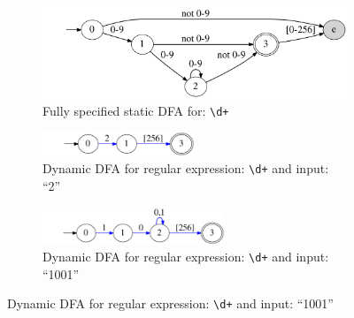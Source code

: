 \begin{figure}[t]
  \begin{subfigure}[t]{0.45\textwidth}
  	\centering
    \includegraphics[width=\textwidth]{figures/digitsDFA}
    \vspace{-12pt}
    \caption{Fully specified static DFA for: {\tt \textbackslash d+}}
    \label{fig:staticfull}
  \end{subfigure}


\vspace{12pt}
  \begin{subfigure}[t]{0.45\textwidth}
  	\centering
    \includegraphics[width=0.5\textwidth]{figures/digits2}
    \vspace{-6pt}
    \caption{Dynamic DFA for regular expression: {\tt \textbackslash d+} and input: ``2''}
    \label{fig:match1}
  \end{subfigure}

\vspace{6pt}

  \begin{subfigure}[t]{0.45\textwidth}
  	\centering
    \includegraphics[width=0.6\textwidth]{figures/digits1001}
    \vspace{-6pt}
    \caption{Dynamic DFA for regular expression: {\tt \textbackslash d+} and input: ``1001''}
    \label{fig:match2}
  \end{subfigure}
  

\end{figure}
